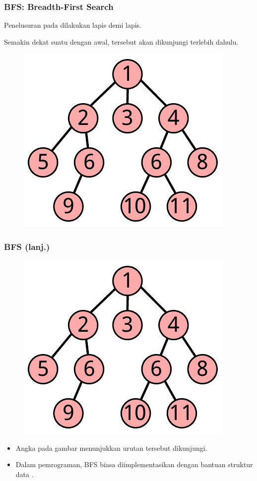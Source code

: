 \begin{frame}
\frametitle{BFS: Breadth-First Search}
Penelusuran \fnode pada \fgraph dilakukan lapis demi lapis. 

Semakin dekat suatu \fnode dengan \fnode awal, \fnode tersebut akan dikunjungi terlebih dahulu. 

\begin{figure}
  \centering
  \includegraphics[width=4 cm]{asset/bfs.pdf}
\end{figure}
\end{frame}

\begin{frame}
\frametitle{BFS (lanj.)}
\begin{figure}
  \centering
  \includegraphics[width=4 cm]{asset/bfs.pdf}
\end{figure}
\begin{itemize}
  \item Angka pada gambar menunjukkan urutan \fnode tersebut dikunjungi.
  \item Dalam pemrograman, BFS biasa diimplementasikan dengan bantuan struktur data .
\end{itemize}
\end{frame}

